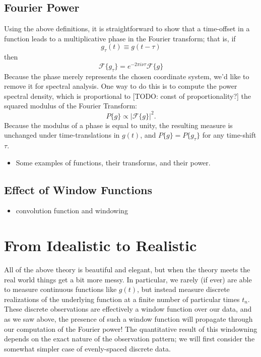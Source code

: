 \documentclass[preprint]{aastex}
\newcommand{\todo}[1]{{\color{red} [TODO: #1]}}
\begin{document}
\subsection{Fourier Power}

Using the above definitions, it is straightforward to show that a time-offset in a function leads to a multiplicative phase in the Fourier transform; that is, if
\begin{equation}
  g_\tau(t) \equiv g(t - \tau)
\end{equation}
then 
\begin{equation}
  \mathcal{F}\{g_\tau\} = e^{-2\pi i \nu \tau}\mathcal{F}\{g\}
\end{equation}
Because the phase merely represents the chosen coordinate system, we'd like to remove it for spectral analysis.
One way to do this is to compute the power spectral density, which is proportional to \todo{const of proportionality?} the squared modulus of the Fourier Transform:
\begin{equation}
  P\{g\} \propto \left| \mathcal{F}\{g\} \right|^2.
\end{equation}
Because the modulus of a phase is equal to unity, the resulting measure is unchanged under time-translations in $g(t)$, and $P\{g\} = P\{g_\tau\}$ for any time-shift $\tau$.

\begin{itemize}
\item Some examples of functions, their transforms, and their power.
\end{itemize}

\subsection{Effect of Window Functions}

\begin{itemize}
\item convolution function and windowing
\end{itemize}

\section{From Idealistic to Realistic}

All of the above theory is beautiful and elegant, but when the theory meets the real world things get a bit more messy.
In particular, we rarely (if ever) are able to measure continuous functions like $g(t)$, but instead measure discrete realizations of the underlying function at a finite number of particular times $t_n$.
These discrete observations are effectively a window function over our data, and as we saw above, the presence of such a window function will propagate through our computation of the Fourier power!
The quantitative result of this windowning depends on the exact nature of the observation pattern; we will first consider the somewhat simpler case of evenly-spaced discrete data.
\end{document}
